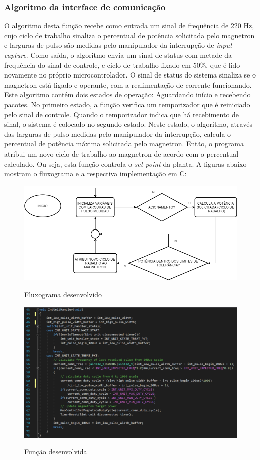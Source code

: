 \subsubsection{Algoritmo da interface de comunicação}
O algoritmo desta função recebe como entrada  um sinal de frequência de 220 Hz, cujo ciclo de trabalho sinaliza o percentual de potência solicitada pelo magnetron e larguras de pulso são medidas pelo manipulador da interrupção de \textit{input capture}. Como saída, o algoritmo envia um sinal de status com metade da frequência do sinal de controle, e ciclo de trabalho fixado em 50\%, que é lido novamente no próprio microcontrolador. O sinal de status do sistema sinaliza se o magnetron está ligado e operante, com a realimentação de corrente funcionando. Este algoritmo contém dois estados de operação: Aguardando início e recebendo pacotes. No primeiro estado, a função verifica um temporizador que é reiniciado pelo sinal de controle. Quando o temporizador indica que há recebimento de sinal, o sistema é colocado no segundo estado. Neste estado, o algoritmo, através das larguras de pulso medidas pelo manipulador da interrupção, calcula o percentual de potência máxima solicitada pelo magnetron. Então, o programa atribui um novo ciclo de trabalho ao magnetron de acordo com o percentual calculado. Ou seja, esta função controla o \textit{set point} da planta. A figuras abaixo mostram o fluxograma e a respectiva implementação em C:
\begin{figure}[H]
    \centering
    \caption{Fluxograma desenvolvido}
    \includegraphics[width=1\textwidth]{./dados/figuras/flow_comm}
    \label{fig:figura-func_comm}
\end{figure}


\begin{figure}[H]
    \centering
    \caption{Função desenvolvida}
    \includegraphics[width=1\textwidth]{./dados/figuras/func_comm}
    \label{fig:figura-func_comm}
\end{figure}